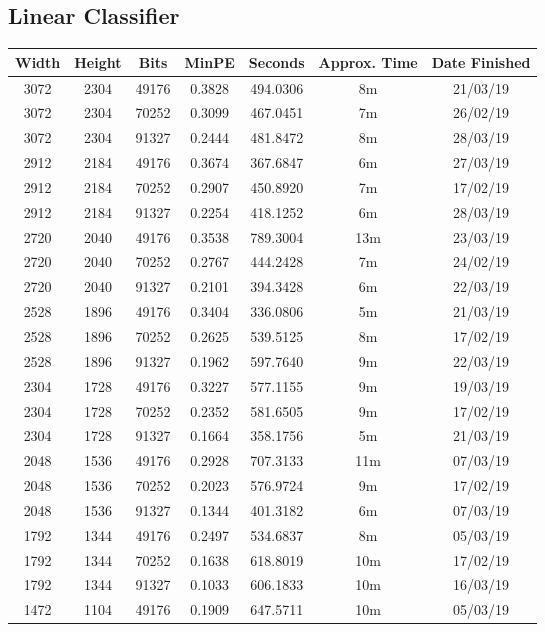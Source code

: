 \subsection{Linear Classifier}
  \begin{center}
  \begin{tabular}{ c c c | c | c c c }
  Width & Height & Bits & MinPE & Seconds & Approx. Time & Date Finished \\ \hline
  3072 & 2304 & 49176 & 0.3828 & 494.0306 & 8m & 21/03/19 \\
  3072 & 2304 & 70252 & 0.3099 & 467.0451 & 7m & 26/02/19 \\
  3072 & 2304 & 91327 & 0.2444 & 481.8472 & 8m & 28/03/19 \\
  2912 & 2184 & 49176 & 0.3674 & 367.6847 & 6m & 27/03/19 \\
  2912 & 2184 & 70252 & 0.2907 & 450.8920 & 7m & 17/02/19 \\
  2912 & 2184 & 91327 & 0.2254 & 418.1252 & 6m & 28/03/19 \\
  2720 & 2040 & 49176 & 0.3538 & 789.3004 & 13m & 23/03/19 \\
  2720 & 2040 & 70252 & 0.2767 & 444.2428 & 7m & 24/02/19 \\
  2720 & 2040 & 91327 & 0.2101 & 394.3428 & 6m & 22/03/19 \\
  2528 & 1896 & 49176 & 0.3404 & 336.0806 & 5m & 21/03/19 \\
  2528 & 1896 & 70252 & 0.2625 & 539.5125 & 8m & 17/02/19 \\
  2528 & 1896 & 91327 & 0.1962 & 597.7640 & 9m & 22/03/19 \\
  2304 & 1728 & 49176 & 0.3227 & 577.1155 & 9m & 19/03/19 \\
  2304 & 1728 & 70252 & 0.2352 & 581.6505 & 9m & 17/02/19 \\
  2304 & 1728 & 91327 & 0.1664 & 358.1756 & 5m & 21/03/19 \\
  2048 & 1536 & 49176 & 0.2928 & 707.3133 & 11m & 07/03/19 \\
  2048 & 1536 & 70252 & 0.2023 & 576.9724 & 9m & 17/02/19 \\
  2048 & 1536 & 91327 & 0.1344 & 401.3182 & 6m & 07/03/19 \\
  1792 & 1344 & 49176 & 0.2497 & 534.6837 & 8m & 05/03/19 \\
  1792 & 1344 & 70252 & 0.1638 & 618.8019 & 10m & 17/02/19 \\
  1792 & 1344 & 91327 & 0.1033 & 606.1833 & 10m & 16/03/19 \\
  1472 & 1104 & 49176 & 0.1909 & 647.5711 & 10m & 05/03/19 \\

\end{tabular}
\end{center}
